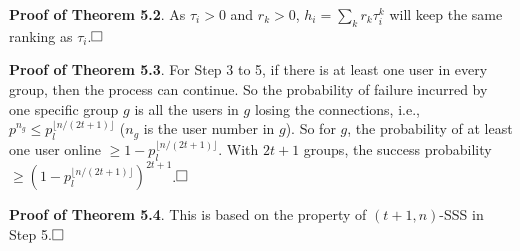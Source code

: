 \vspace{+.5em}

\noindent \textbf{Proof of Theorem 5.2}. As $\tau_i>0$ and $r_k>0$, $h_i=\sum_k r_k\tau_i^k$ will keep the same ranking as $\tau_i$.$\qed$


\vspace{+.5em}

\noindent \textbf{Proof of Theorem 5.3}. For Step 3 to 5, if there is at least one user in every group, then the process can continue. So the probability of failure incurred by one specific group $g$ is all the users in $g$ losing the connections, i.e., $p^{n_g} \le p_l^{\lfloor n/(2t+1) \rfloor}$ ($n_g$ is the user number in $g$). So for $g$, the probability of at least one user online $\ge 1-p_l^{\lfloor n/(2t+1) \rfloor}$. With $2t+1$ groups, the success probability $\ge (1-p_l^{\lfloor n/(2t+1) \rfloor})^{2t+1}$.$\qed$

\vspace{+.5em}

\noindent \textbf{Proof of Theorem 5.4}. This is based on the property of $(t+1, n)$-SSS in Step 5.$\qed$


\vspace{+.5em}

